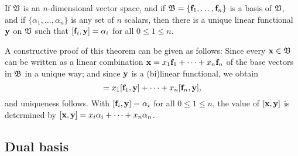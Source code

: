 If ${\frak V}$ is an $n$-dimensional vector space, and if ${\frak B} = \{{\bf f}_1,\ldots , {\bf f}_n\}$
is a basis of  ${\frak V}$, and if
$\{\alpha_1, \ldots ,\alpha_n\}$  is any set of $n$ scalars, then there is
a unique linear functional ${\bf y}$  on  ${\frak V}$ such that
$ [ {\bf f}_i, {\bf y}] = \alpha_i $ for all $0\le 1 \le n$.

A constructive proof of this theorem can be given as follows:
Since every ${\bf x}\in {\frak V}$
can be written as a linear combination
$ {\bf x} = x_1 {\bf f}_1 +\cdots + x_n {\bf f}_n$
of the base vectors in ${\frak B}$ in a unique way;
and since ${\bf y}$ is a (bi)linear functional, we obtain
\begin{equation}
[{\bf x},{\bf y}]
=
x_1 [{\bf f}_1 ,{\bf y}] +\cdots + x_n [{\bf f}_n ,{\bf y}] ,
\end{equation}
and uniqueness follows.
With $[{\bf f}_i ,{\bf y}] = \alpha_i$  for all  $0\le 1 \le n$,
the value of
$[{\bf x},{\bf y}]$ is determined by
$[{\bf x},{\bf y}] = x_i\alpha_i + \cdots + x_n\alpha_n$.

\subsection{Dual basis}
\label{2011-m-Dualbasis}


